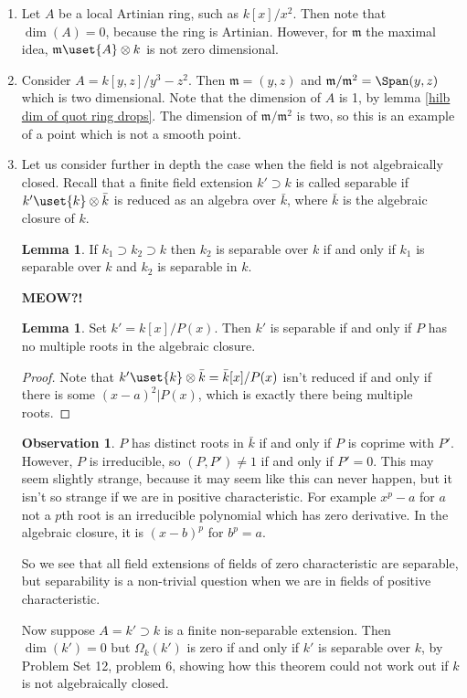\documentclass[12 pt]{article}
\theoremstyle{definition}
\newtheorem{lemma}[theorem]{Lemma}
\newtheorem{obs}[theorem]{Observation}
\begin{document}
\begin{enumerate}
\item Let $A$ be a local Artinian ring, such as $k[x]/x^2$. Then note that $\dim(A)=0$, because the ring is Artinian. However, for $\mathfrak{m}$ the maximal idea, $\mathfrak{m} \uset{A}\otimes k$ is not zero dimensional.

\item Consider $A=k[y,z]/y^3-z^2$. Then $\mathfrak{m}=(y,z)$ and $\mathfrak{m}/\mathfrak{m}^2=\Span(y,z)$ which is two dimensional. Note that the dimension of $A$ is 1, by
    lemma \ref{hilb dim of quot ring drops}. The dimension of $\mathfrak{m}/\mathfrak{m}^2$ is two, so this is an example of a point which is not a smooth point.

\item Let us consider further in depth the case when the field is not algebraically closed. Recall that a finite field extension $k' \supset k$ is called separable if $k' \uset{k} \otimes \bar{k}$ is reduced as an algebra over $\bar{k}$, where $\bar{k}$ is the algebraic closure of $k$.

    \begin{lemma} If $k_1 \supset k_2 \supset k$ then $k_2$ is separable over $k$ if and only if $k_1$ is separable over $k$ and $k_2$ is separable in $k$.
    \end{lemma}
    \textcolor[rgb]{0.98,0.00,0.00}{\textbf{MEOW?!}}

    \begin{lemma} Set $k'=k[x]/P(x)$. Then $k'$ is separable if and only if $P$ has no multiple roots in the algebraic closure.
    \end{lemma}
    \begin{proof} Note that $k' \uset{k}\otimes \bar{k}=\bar{k}[x]/P(x)$ isn't reduced if and only if there is some $(x-a)^2|P(x)$, which is exactly there being multiple roots.
    \end{proof}

    \begin{obs} $P$ has distinct roots in $\bar{k}$ if and only if $P$ is coprime with $P'$. However, $P$ is irreducible, so $(P,P') \neq 1$ if and only if $P'=0$. This may seem slightly strange, because it may seem like this can never happen, but it isn't so strange if we are in positive characteristic. For example $x^p-a$ for $a$ not a $p$th root is an irreducible polynomial which has zero derivative. In the algebraic closure, it is $(x-b)^p$ for $b^p=a$.

    So we see that all field extensions of fields of zero characteristic are separable, but separability is a non-trivial question when we are in fields of positive characteristic.
    \end{obs}

    Now suppose $A=k' \supset k$ is a finite non-separable extension. Then $\dim(k')=0$ but $\Omega_k(k')$ is zero if and only if $k'$ is separable over $k$, by Problem Set 12, problem 6, showing how this theorem could not work out if $k$ is not algebraically closed.
\end{enumerate}
\end{document}

